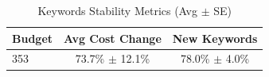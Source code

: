 \begin{table}[htbp]
\centering
\caption{Keywords Stability Metrics (Avg $\pm$ SE)}
\begin{tabular}{lcc}
\toprule
Budget & Avg Cost Change & New Keywords \\
\midrule
353 & 73.7\% $\pm$ 12.1\% & 78.0\% $\pm$ 4.0\% \\
\bottomrule
\end{tabular}
\end{table}
